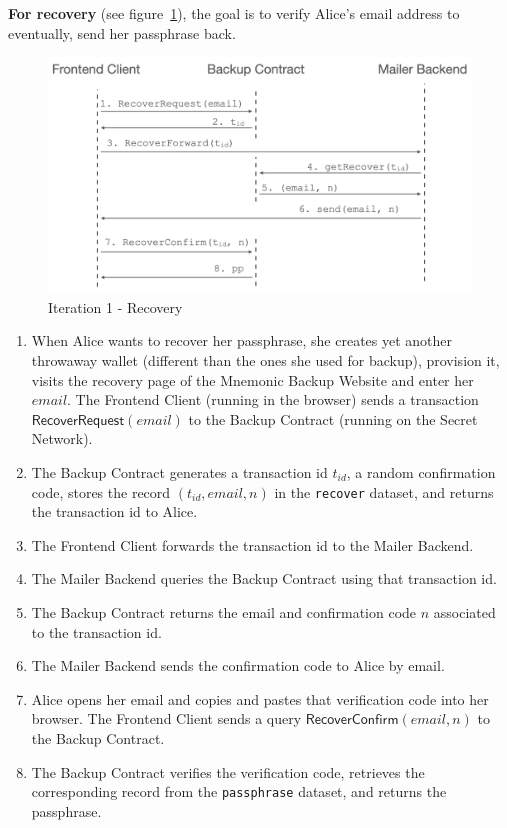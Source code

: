 \documentclass[runningheads]{llncs}
\newcommand{\ms}[1]{\ensuremath{\mathsf{#1}}}
\begin{document}
{\bf For recovery} (see figure~\ref{it1:recovery}), the goal is to verify Alice's email address to eventually, send her passphrase back. 

\begin{figure}[t]
  \includegraphics[width=\linewidth]{./media/media-002.png}
  \caption{Iteration 1 - Recovery}
  \label{it1:recovery}
\end{figure}

\begin{enumerate}
\item When Alice wants to recover her passphrase, she creates yet another throwaway wallet (different than the ones she used for backup), provision it, visits the recovery page of the Mnemonic Backup Website and enter her $email$. The Frontend Client (running in the browser) sends a transaction {\bf $\ms{RecoverRequest}(email)$} to the Backup Contract (running on the Secret Network). 
\item The Backup Contract generates a transaction id $t_{id}$, a random confirmation code, stores the record $(t_{id}, email, n)$ in the {\tt recover} dataset, and returns the transaction id to Alice.
\item The Frontend Client forwards the transaction id to the Mailer Backend. 
\item The Mailer Backend queries the Backup Contract using that transaction id. 
\item The Backup Contract returns the email and confirmation code $n$ associated to the transaction id. 
\item The Mailer Backend sends the confirmation code to Alice by email. 
\item Alice opens her email and copies and pastes that verification code into her browser. The Frontend Client sends a query $\ms{RecoverConfirm}(email, n)$ to the Backup Contract. 
\item The Backup Contract verifies the verification code, retrieves the corresponding record from the {\tt passphrase} dataset, and returns the passphrase.
\end{enumerate}
\end{document}
